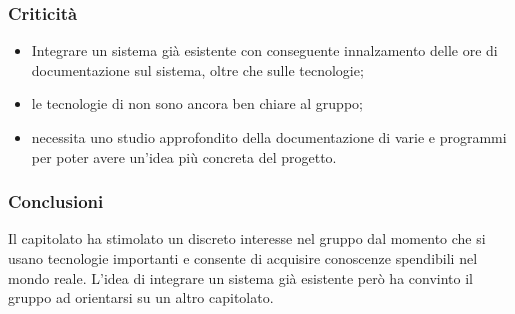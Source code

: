 		\subsubsection{Criticità}
			\begin{itemize}
				\item Integrare un sistema già esistente con conseguente innalzamento delle ore di documentazione sul sistema, oltre che sulle tecnologie;
				\item le tecnologie di  non sono ancora ben chiare al gruppo;
				\item necessita uno studio approfondito della documentazione di varie  e programmi per poter avere un'idea più concreta del progetto.
			\end{itemize}

		\subsubsection{Conclusioni}
			Il capitolato ha stimolato un discreto interesse nel gruppo dal momento che si usano tecnologie importanti e consente di acquisire conoscenze spendibili nel mondo reale. L'idea di integrare un sistema già esistente però ha convinto il gruppo ad orientarsi su un altro capitolato.
